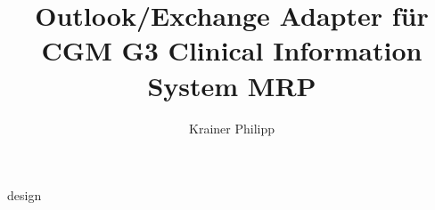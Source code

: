 \documentclass[bachelor,german]{hgbthesis}
\begin{document}
\title{Outlook/Exchange Adapter für CGM G3 Clinical Information System MRP}
\author{Krainer Philipp}




\frontmatter
\maketitle


\tableofcontents





\mainmatter


 {design}




\MakeBibliography
\end{document}
